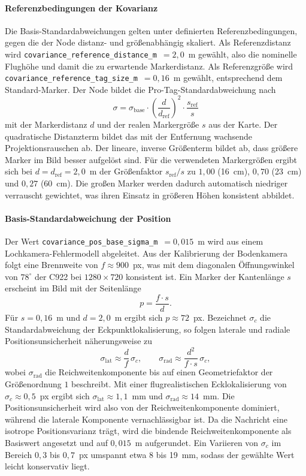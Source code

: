 \paragraph{Referenzbedingungen der Kovarianz}
Die Basis-Standardabweichungen gelten unter definierten Referenzbedingungen, gegen die der Node distanz- und größenabhängig skaliert.
Als Referenzdistanz wird \texttt{covariance\_reference\_distance\_m}~$=2{,}0$~m gewählt, also die nominelle Flughöhe und damit die zu erwartende Markerdistanz.
Als Referenzgröße wird \texttt{covariance\_reference\_tag\_size\_m}~$=0{,}16$~m gewählt, entsprechend dem Standard-Marker.
Der Node bildet die Pro-Tag-Standardabweichung nach
\begin{equation}
\sigma = \sigma_\text{base}\cdot\left(\frac{d}{d_\text{ref}}\right)^{2}\cdot\frac{s_\text{ref}}{s}
\label{eq:sigma_scaling}
\end{equation}
mit der Markerdistanz $d$ und der realen Markergröße $s$ aus der Karte.
Der quadratische Distanzterm bildet das mit der Entfernung wachsende Projektionsrauschen ab.
Der lineare, inverse Größenterm bildet ab, dass größere Marker im Bild besser aufgelöst sind.
Für die verwendeten Markergrößen ergibt sich bei $d=d_\text{ref}=2{,}0$~m der Größenfaktor $s_\text{ref}/s$ zu $1{,}00$ (16~cm), $0{,}70$ (23~cm) und $0{,}27$ (60~cm).
Die großen Marker werden dadurch automatisch niedriger verrauscht gewichtet, was ihren Einsatz in größeren Höhen konsistent abbildet.

\paragraph{Basis-Standardabweichung der Position}
Der Wert \texttt{covariance\_pos\_base\_sigma\_m}~$=0{,}015$~m wird aus einem Lochkamera-Fehlermodell abgeleitet.
Aus der Kalibrierung der Bodenkamera folgt eine Brennweite von $f\approx 900$~px, was mit dem diagonalen Öffnungswinkel von $78^\circ$ der C922 bei $1280\times720$ konsistent ist.
Ein Marker der Kantenlänge $s$ erscheint im Bild mit der Seitenlänge
\begin{equation}
p = \frac{f\cdot s}{d}.
\end{equation}
Für $s=0{,}16$~m und $d=2{,}0$~m ergibt sich $p\approx 72$~px.
Bezeichnet $\sigma_c$ die Standardabweichung der Eckpunktlokalisierung, so folgen laterale und radiale Positionsunsicherheit näherungsweise zu
\begin{equation}
\sigma_\text{lat} \approx \frac{d}{f}\,\sigma_c,
\qquad
\sigma_\text{rad} \approx \frac{d^{2}}{f\cdot s}\,\sigma_c,
\end{equation}
wobei $\sigma_\text{rad}$ die Reichweitenkomponente bis auf einen Geometriefaktor der Größenordnung $1$ beschreibt.
Mit einer flugrealistischen Ecklokalisierung von $\sigma_c\approx 0{,}5$~px ergibt sich $\sigma_\text{lat}\approx 1{,}1$~mm und $\sigma_\text{rad}\approx 14$~mm.
Die Positionsunsicherheit wird also von der Reichweitenkomponente dominiert, während die laterale Komponente vernachlässigbar ist.
Da die Nachricht eine isotrope Positionsvarianz trägt, wird die bindende Reichweitenkomponente als Basiswert angesetzt und auf $0{,}015$~m aufgerundet.
Ein Variieren von $\sigma_c$ im Bereich $0{,}3$ bis $0{,}7$~px umspannt etwa 8 bis 19~mm, sodass der gewählte Wert leicht konservativ liegt.

